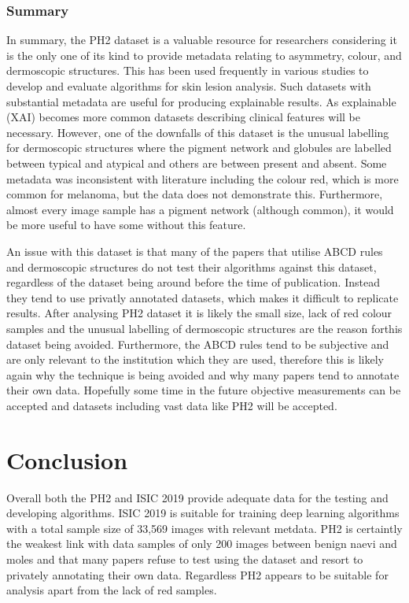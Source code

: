\subsubsection{Summary}
In summary, the PH2 dataset is a valuable resource for researchers considering it is the only one of its kind to provide metadata relating to asymmetry, colour, and dermoscopic structures. This has been used frequently in various studies to develop and evaluate algorithms for skin lesion analysis. Such datasets with substantial metadata are useful for producing explainable results. As explainable (XAI) becomes more common datasets describing clinical features will be necessary. However, one of the downfalls of this dataset is the unusual labelling for dermoscopic structures where the pigment network and globules are labelled between typical and atypical and others are between present and absent. Some metadata was inconsistent with literature including the colour red, which is more common for melanoma, but the data does not demonstrate this. Furthermore, almost every image sample has a pigment network (although common), it would be more useful to have some without this feature. 

An issue with this dataset is that many of the papers that utilise ABCD rules and dermoscopic structures do not test their algorithms against this dataset, regardless of the dataset being around before the time of publication\cite{Kasmi2016, She2007, Tenenhaus2010, Ramezani2014, Zaqout2016}. Instead they tend to use privatly annotated datasets, which makes it difficult to replicate results. After analysing PH2 dataset it is likely the small size, lack of red colour samples and the unusual labelling of dermoscopic structures are the reason forthis dataset being avoided. Furthermore, the ABCD rules tend to be subjective and are only relevant to the institution which they are used, therefore this is likely again why the technique is being avoided and why many papers tend to annotate their own data. Hopefully some time in the future objective measurements can be accepted and datasets including vast data like PH2 will be accepted.

\section{Conclusion}
Overall both the PH2 and ISIC 2019 provide adequate data for the testing and developing algorithms. ISIC 2019 is suitable for training deep learning algorithms with a total sample size of 33,569 images with relevant metdata. PH2 is certaintly the weakest link with data samples of only 200 images between benign naevi and moles and that many papers refuse to test using the dataset and resort to privately annotating their 
own data. Regardless PH2 appears to be suitable for analysis apart from the lack of red samples.

